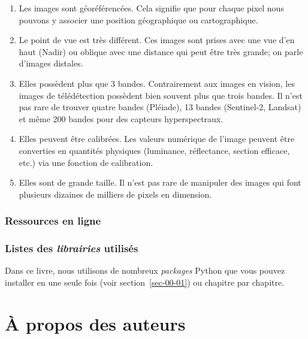 \documentclass[
  11pt,
  letterpaper,
  open=any,
  twoside=false,
  french]{scrbook}
\begin{document}
\begin{enumerate}
\def\labelenumi{\arabic{enumi}.}
\item
  Les images sont géoréférencées. Cela signifie que pour chaque pixel
  nous pouvons y associer une position géographique ou cartographique.
\item
  Le point de vue est très différent. Ces images sont prises avec une
  vue d'en haut (Nadir) ou oblique avec une distance qui peut être très
  grande; on parle d'images distales.
\item
  Elles possèdent plus que 3 bandes. Contrairement aux images en vision,
  les images de télédétection possèdent bien souvent plus que trois
  bandes. Il n'est pas rare de trouver quatre bandes (Pléiade), 13
  bandes (Sentinel-2, Landsat) et même 200 bandes pour des capteurs
  hyperspectraux.
\item
  Elles peuvent être calibrées. Les valeurs numérique de l'image peuvent
  être converties en quantités physiques (luminance, réflectance,
  section efficace, etc.) via une fonction de calibration.
\item
  Elles sont de grande taille. Il n'est pas rare de manipuler des images
  qui font plusieurs dizaines de milliers de pixels en dimension.
\end{enumerate}

\subsection*{Ressources en ligne}\label{ressources-en-ligne}

\subsection*{\texorpdfstring{Listes des \emph{librairies}
utilisés}{Listes des librairies utilisés}}\label{sect0071}

Dans ce livre, nous utilisons de nombreux \emph{packages} Python que
vous pouvez installer en une seule fois (voir section~\ref{sec-00-01})
ou chapitre par chapitre.


\chapter*{À propos des auteurs}\label{auteurs}
\end{document}
